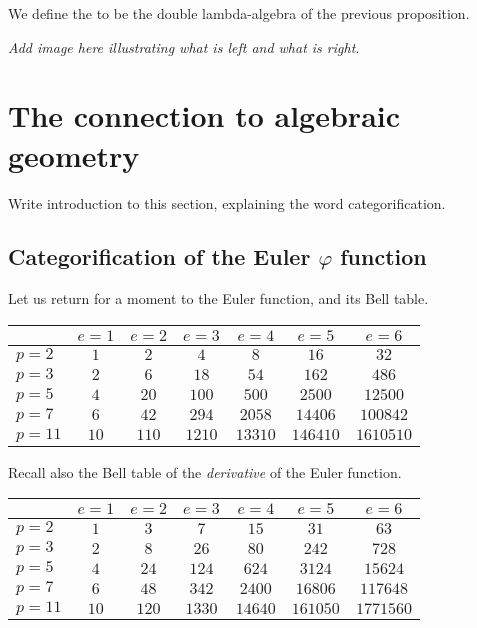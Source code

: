 \documentclass[a4paper]{article}
\begin{document}
\begin{definition}
We define the  to be the double lambda-algebra of the previous proposition.
\end{definition}
 



\emph{Add image here illustrating what is left and what is right.}





\section{The connection to algebraic geometry}

Write introduction to this section, explaining the word categorification.

\subsection{Categorification of the Euler $\varphi$ function}

Let us return for a moment to the Euler function, and its Bell table.

\begin{center}
\begin{tabular}{| l | | c | c | c | c | c | c |}
\hline
& $e = 1$ & $e = 2$ & $e = 3$ & $e = 4$ & $e = 5$ & $e = 6$\\
\hline
\hline
$p = 2$ & $1$ & $2$ & $4$ & $8$ & $16$ & $32$ \\
\hline
$p = 3$ & $2$ & $6$ & $18$ & $54$ & $162$ & $486$ \\
\hline
$p = 5$ & $4$ & $20$ & $100$ & $500$ & $2500$ & $12500$ \\
\hline
$p = 7$ & $6$ & $42$ & $294$ & $2058$ & $14406$ & $100842$ \\
\hline
$p = 11$ & $10$ & $110$ & $1210$ & $13310$ & $146410$ & $1610510$ \\
\hline
\end{tabular}
\end{center}

Recall also the Bell table of the \emph{derivative} of the Euler function.

\vskip10pt
\begin{center}
\begin{tabular}{| l | | c | c | c | c | c | c |}
\hline
& $e = 1$ & $e = 2$ & $e = 3$ & $e = 4$ & $e = 5$ & $e = 6$\\
\hline
\hline
$p = 2$ & $1$ & $3$ & $7$ & $15$ & $31$ & $63$ \\
\hline
$p = 3$ & $2$ & $8$ & $26$ & $80$ & $242$ & $728$ \\
\hline
$p = 5$ & $4$ & $24$ & $124$ & $624$ & $3124$ & $15624$ \\
\hline
$p = 7$ & $6$ & $48$ & $342$ & $2400$ & $16806$ & $117648$ \\
\hline
$p = 11$ & $10$ & $120$ & $1330$ & $14640$ & $161050$ & $1771560$ \\
\hline
\end{tabular}
\end{center}
\end{document}
